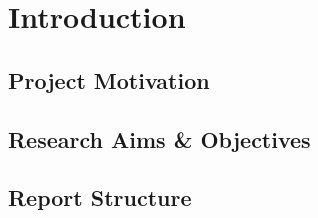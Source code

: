 \chapter{Introduction} %
\label{Chapter1}
\blindtext

\section{Project Motivation}

\section{Research Aims \& Objectives}

\section{Report Structure}
